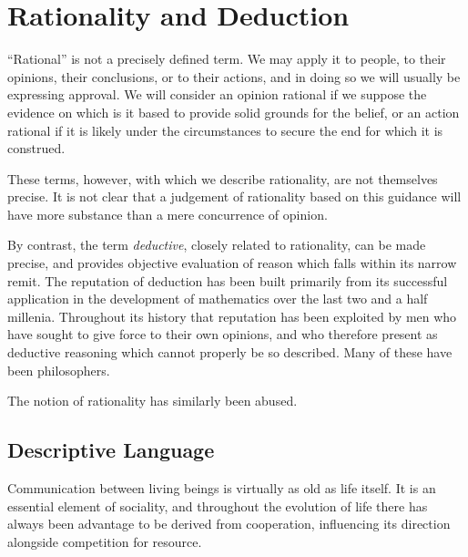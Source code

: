 \def\rbjidch001{$$Id: ch001.tex,v 1.1 2010/01/10 21:30:10 rbj Exp $$}
\chapter{Rationality and Deduction}\label{RationalityDeduction}

``Rational'' is not a precisely defined term.
We may apply it to people, to their opinions, their conclusions, or to their actions, and in doing so we will usually be expressing approval.
We will consider an opinion rational if we suppose the evidence on which is it based to provide solid grounds for the belief, or an action rational if it is likely under the circumstances to secure the end for which it is construed.

These terms, however, with which we describe rationality, are not themselves precise.
It is not clear that a judgement of rationality based on this guidance will have more substance than a mere concurrence of opinion.

By contrast, the term {\it deductive}, closely related to rationality, can be made precise, and provides objective evaluation of reason which falls within its narrow remit.
The reputation of deduction has been built primarily from its successful application in the development of mathematics over the last two and a half millenia.
Throughout its history that reputation has been exploited by men who have sought to give force to their own opinions, and who therefore present as deductive reasoning which cannot properly be so described.
Many of these have been philosophers.

The notion of rationality has similarly been abused.

\section{Descriptive Language}

Communication between living beings is virtually as old as life itself.
It is an essential element of sociality, and throughout the evolution of life there has always been advantage to be derived from cooperation, influencing its direction alongside competition for resource.
